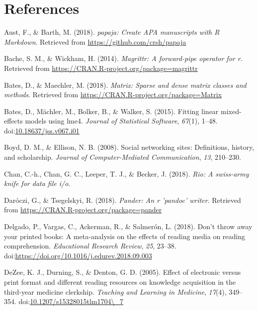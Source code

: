 \documentclass[man, fleqn, noextraspace]{apa6}
\theoremstyle{definition}
\theoremstyle{definition}
\theoremstyle{definition}
\theoremstyle{remark}
\begin{document}
\newpage

\section{References}\label{references}

\begingroup
\setlength{\parindent}{-0.5in} \setlength{\leftskip}{0.5in}

\hypertarget{refs}{}
\hypertarget{ref-R-papaja}{}
Aust, F., \& Barth, M. (2018). \emph{papaja: Create APA manuscripts with
R Markdown}. Retrieved from \url{https://github.com/crsh/papaja}

\hypertarget{ref-R-magrittr}{}
Bache, S. M., \& Wickham, H. (2014). \emph{Magrittr: A forward-pipe
operator for r}. Retrieved from
\url{https://CRAN.R-project.org/package=magrittr}

\hypertarget{ref-R-Matrix}{}
Bates, D., \& Maechler, M. (2018). \emph{Matrix: Sparse and dense matrix
classes and methods}. Retrieved from
\url{https://CRAN.R-project.org/package=Matrix}

\hypertarget{ref-R-lme4}{}
Bates, D., Mächler, M., Bolker, B., \& Walker, S. (2015). Fitting linear
mixed-effects models using lme4. \emph{Journal of Statistical Software},
\emph{67}(1), 1--48.
doi:\href{https://doi.org/10.18637/jss.v067.i01}{10.18637/jss.v067.i01}

\hypertarget{ref-Boyd2008}{}
Boyd, D. M., \& Ellison, N. B. (2008). Social networking sites:
Definitions, history, and scholarship. \emph{Journal of
Computer-Mediated Communication}, \emph{13}, 210--230.

\hypertarget{ref-R-rio}{}
Chan, C.-h., Chan, G. C., Leeper, T. J., \& Becker, J. (2018).
\emph{Rio: A swiss-army knife for data file i/o}.

\hypertarget{ref-R-pander}{}
Daróczi, G., \& Tsegelskyi, R. (2018). \emph{Pander: An r 'pandoc'
writer}. Retrieved from \url{https://CRAN.R-project.org/package=pander}

\hypertarget{ref-Delgado2018}{}
Delgado, P., Vargas, C., Ackerman, R., \& Salmerón, L. (2018). Don't
throw away your printed books: A meta-analysis on the effects of reading
media on reading comprehension. \emph{Educational Research Review},
\emph{25}, 23--38.
doi:\href{https://doi.org/https://doi.org/10.1016/j.edurev.2018.09.003}{https://doi.org/10.1016/j.edurev.2018.09.003}

\hypertarget{ref-DeZee2005}{}
DeZee, K. J., Durning, S., \& Denton, G. D. (2005). Effect of electronic
versus print format and different reading resources on knowledge
acquisition in the third-year medicine clerkship. \emph{Teaching and
Learning in Medicine}, \emph{17}(4), 349--354.
doi:\href{https://doi.org/10.1207/s15328015tlm1704/_7}{10.1207/s15328015tlm1704\textbackslash{}\_7}
\end{document}
